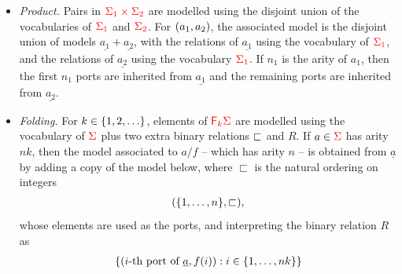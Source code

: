 \begin{definition}
\begin{itemize}
        \item \emph{Product.}   Pairs in   ${\color{red}{\Sigma_1 \times\Sigma_2}}$ are modelled
        using the disjoint union of the vocabularies of ${\color{red}{\Sigma_1}}$ and ${\color{red}{\Sigma_2}}$. 
            For  $(a_1,a_2)$, the associated model is    the disjoint union of models $\underline{a_1} + \underline {a_2}$, with the relations of $\underline {a_1}$ using the  vocabulary of ${{\color{red}{\Sigma_1}}}$, and the relations of $\underline {a_2}$ using the vocabulary  ${{\color{red}{\Sigma_1}}}$. 
            If $n_1$ is the arity of $a_1$, then the first $n_1$ ports are inherited from  $\underline {a_1}$ and the remaining ports are inherited from  $\underline {a_2}$.
        \item \emph{Folding.}   For $k \in \{1,2,\ldots\}$, elements of   ${\color{red}{\mathsf F_{k}}}{\color{red}{\Sigma}}$ are modelled using the  vocabulary of ${\color{red}{\Sigma}}$ plus two extra binary relations $\sqsubset$ and $R$. If $a \in {\color{red}{\Sigma}}$ has arity $nk$, then the model associated to $a/f$ -- which has arity $n$ --   is obtained from  $\underline{a}$ by adding a copy of the model below, where $\sqsubset$ is the natural ordering on integers
                \begin{align*}
                (\{1,\ldots,n\}, \sqsubset),
                \end{align*}
whose elements are used as the ports, and interpreting the binary relation $R$ as
        \begin{align*}
        \{(\text{$i$-th port of $\underline a$},f(i)) : i \in \{1,\ldots,nk\}\}
        \end{align*}
                

\end{itemize}
\end{definition}
